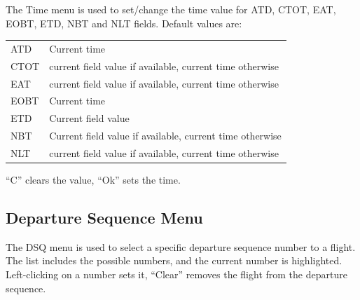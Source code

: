\documentclass[a4paper,oneside,11pt]{memoir}
\begin{document}
The Time menu is used to set/change the time value for ATD, CTOT, EAT, EOBT, ETD, NBT and NLT fields.
Default values are:

\begin{longtable}{p{5cm} p{7.5cm}}
ATD     & Current time\\
CTOT    & current field value if available, current time otherwise\\
EAT     & current field value if available, current time otherwise\\
EOBT    & Current time\\
ETD     & Current field value\\
NBT     & Current field value if available, current time otherwise\\
NLT     & current field value if available, current time otherwise\\
\end{longtable}

“C” clears the value, “Ok” sets the time.

\subsection{Departure Sequence Menu}
\label{menu:dqm}

The DSQ menu is used to select a specific departure sequence number to a flight. The list includes the possible numbers, and the current number is highlighted. Left-clicking on a number sets it, “Clear” removes the flight from the departure sequence.


% 
% 
% 
% 
% 
% 
% 
\end{document}
